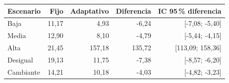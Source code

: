 \begin{tabular}{lrrrr}\toprule
Escenario & Fijo & Adaptativo & Diferencia & IC 95\,\% diferencia\\\midrule
Baja & 11,17 & 4,93 & -6,24 & [-7,08; -5,40] \\
Media & 12,90 & 8,10 & -4,79 & [-5,44; -4,15] \\
Alta & 21,45 & 157,18 & 135,72 & [113,09; 158,36] \\
Desigual & 19,13 & 11,75 & -7,38 & [-8,57; -6,20] \\
Cambiante & 14,21 & 10,18 & -4,03 & [-4,82; -3,23] \\
\bottomrule
\end{tabular}
